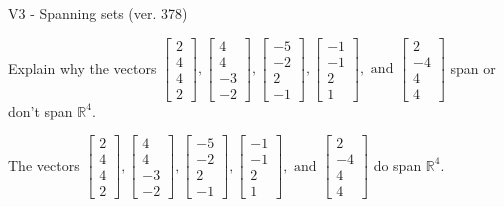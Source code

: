 \begin{exercise}
  \begin{exerciseTitle}V3 - Spanning sets (ver. 378)\end{exerciseTitle}
  \begin{exerciseStatement}
    Explain why the vectors \(\left[\begin{array}{r}
2 \\
4 \\
4 \\
2
\end{array}\right] , \left[\begin{array}{r}
4 \\
4 \\
-3 \\
-2
\end{array}\right] , \left[\begin{array}{r}
-5 \\
-2 \\
2 \\
-1
\end{array}\right] , \left[\begin{array}{r}
-1 \\
-1 \\
2 \\
1
\end{array}\right] , \text{ and } \left[\begin{array}{r}
2 \\
-4 \\
4 \\
4
\end{array}\right]\) span or don't span \(\mathbb{R}^4\). 
	


  \end{exerciseStatement}
  \begin{exerciseAnswer}
   The vectors \(\left[\begin{array}{r}
2 \\
4 \\
4 \\
2
\end{array}\right] , \left[\begin{array}{r}
4 \\
4 \\
-3 \\
-2
\end{array}\right] , \left[\begin{array}{r}
-5 \\
-2 \\
2 \\
-1
\end{array}\right] , \left[\begin{array}{r}
-1 \\
-1 \\
2 \\
1
\end{array}\right] , \text{ and } \left[\begin{array}{r}
2 \\
-4 \\
4 \\
4
\end{array}\right]\) 
  	 do  
	span \(\mathbb{R}^4\).
  



\end{exerciseAnswer}
\end{exercise}
